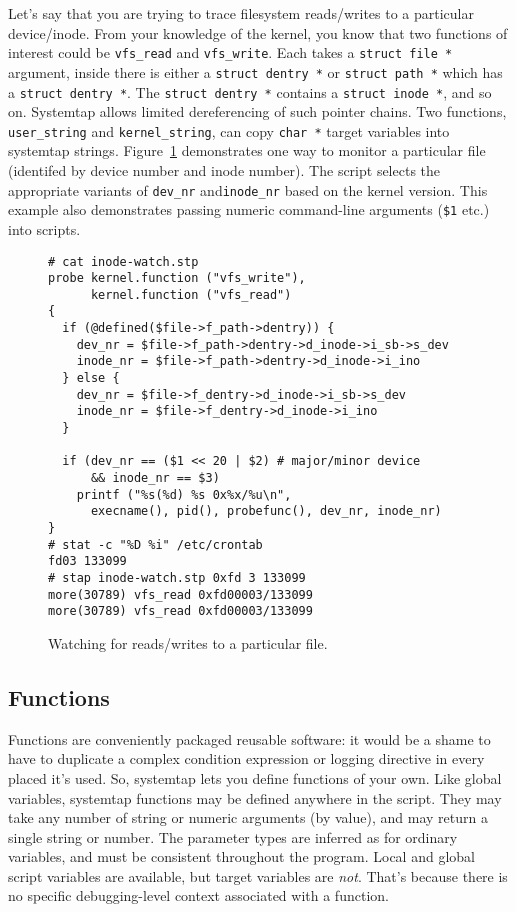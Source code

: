 \documentclass{article}
\newenvironment{boxedminipage}%
    {\begin{makeimage}\begin{center}\begin{Sbox}\begin{minipage}}%
    {\end{minipage}\end{Sbox}\fbox{\TheSbox}\end{center}\end{makeimage}}
\renewcommand{\nomenclature}[2]{}
\begin{document}
Let's say that you are trying to trace filesystem reads/writes to a
particular device/inode.  From your knowledge of the kernel, you know
that two functions of interest could be \verb+vfs_read+ and
\verb+vfs_write+.  Each takes a \verb+struct file *+ argument, inside
there is either a \verb+struct dentry *+ or \verb+struct path *+ which
has a \verb+struct dentry *+.
The \verb+struct dentry *+ contains a \verb+struct inode *+, and
so on.
Systemtap allows limited dereferencing of such pointer chains.
Two functions, \verb+user_string+ and \verb+kernel_string+, can copy
\verb+char *+ target variables into systemtap strings.
Figure~\ref{fig:inode-watch} demonstrates one way to monitor a
particular file (identifed by device number and inode number).
The script selects the appropriate variants of \verb+dev_nr+
and\verb+inode_nr+ based on the kernel version.
This example also demonstrates passing numeric command-line arguments
(\verb+$1+ etc.) into scripts.

\begin{figure}[!ht]
\begin{boxedminipage}{4.5in}
\begin{verbatim}
# cat inode-watch.stp
probe kernel.function ("vfs_write"),
      kernel.function ("vfs_read")
{
  if (@defined($file->f_path->dentry)) {
    dev_nr = $file->f_path->dentry->d_inode->i_sb->s_dev
    inode_nr = $file->f_path->dentry->d_inode->i_ino
  } else {
    dev_nr = $file->f_dentry->d_inode->i_sb->s_dev
    inode_nr = $file->f_dentry->d_inode->i_ino
  }

  if (dev_nr == ($1 << 20 | $2) # major/minor device
      && inode_nr == $3)
    printf ("%s(%d) %s 0x%x/%u\n",
      execname(), pid(), probefunc(), dev_nr, inode_nr)
}
# stat -c "%D %i" /etc/crontab
fd03 133099
# stap inode-watch.stp 0xfd 3 133099
more(30789) vfs_read 0xfd00003/133099
more(30789) vfs_read 0xfd00003/133099
\end{verbatim}
\end{boxedminipage}
\caption{Watching for reads/writes to a particular file.}
\label{fig:inode-watch}
\end{figure}

\subsection{Functions}

Functions are conveniently packaged reusable software: it would be a
shame to have to duplicate a complex condition expression or logging
directive in every placed it's used.  So, systemtap lets you define
functions of your own.  Like global variables, systemtap functions may
be defined anywhere in the script.  They may take any number of string
or numeric arguments (by value), and may return a single string or
number.  The parameter types are inferred as for ordinary variables,
and must be consistent throughout the program.  Local and global
script variables are available, but target variables are {\em not}.
That's because there is no specific debugging-level context associated
with a function.
\nomenclature{function}{A clump of parametrized script statements that
may be repeatedly and recursively called from probe handlers and other
functions.}
\end{document}
